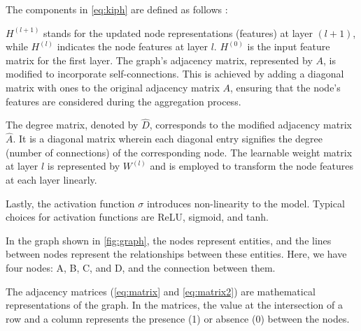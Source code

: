 The components in \cref{eq:kiph} are defined as follows \autocite{DBLP:journals/corr/KipfW16}:

$H^{(l+1)}$ stands for the updated node representations (features) at layer $(l+1)$, while $H^{(l)}$ indicates the node features at layer $l$. $H^{(0)}$ is the input feature matrix for the first layer. The graph's adjacency matrix, represented by $A$, is modified to incorporate self-connections. This is achieved by adding a diagonal matrix with ones to the original adjacency matrix $A$, ensuring that the node's features are considered during the aggregation process.

The degree matrix, denoted by $\hat{D}$, corresponds to the modified adjacency matrix $\hat{A}$. It is a diagonal matrix wherein each diagonal entry signifies the degree (number of connections) of the corresponding node. The learnable weight matrix at layer $l$ is represented by $W^{(l)}$ and is employed to transform the node features at each layer linearly.

Lastly, the activation function $\sigma$ introduces non-linearity to the model. Typical choices for activation functions are ReLU, sigmoid, and tanh.

In the graph shown in \cref{fig:graph}, the nodes represent entities, and the lines between nodes represent the relationships between these entities. Here, we have four nodes: A, B, C, and D, and the connection between them. 

The adjacency matrices (\cref{eq:matrix} and \cref{eq:matrix2}) are mathematical representations of the graph. In the matrices, the value at the intersection of a row and a column represents the presence (1) or absence (0) between the nodes.

